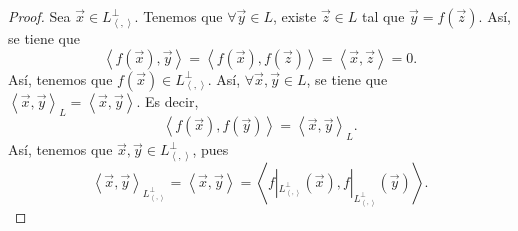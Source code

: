 \begin{proof}
Sea $\displaystyle \vec{x} \in L^{\perp }_{\left\langle ,  \right\rangle } $. Tenemos que $\displaystyle \forall\vec{y} \in L $, existe $\displaystyle \vec{z} \in L $ tal que $\displaystyle \vec{y} = f\left(\vec{z}\right) $. Así, se tiene que 
\[\left\langle f\left(\vec{x}\right), \vec{y} \right\rangle = \left\langle f\left(\vec{x}\right), f\left(\vec{z}\right) \right\rangle = \left\langle \vec{x}, \vec{z} \right\rangle = 0 .\]
Así, tenemos que $\displaystyle f\left(\vec{x}\right) \in L^{\perp }_{\left\langle ,  \right\rangle } $. Así, $\displaystyle \forall \vec{x}, \vec{y} \in L $, se tiene que $\displaystyle \left\langle \vec{x}, \vec{y} \right\rangle _{L} = \left\langle \vec{x}, \vec{y} \right\rangle  $. Es decir,
\[\left\langle f\left(\vec{x}\right), f\left(\vec{y}\right) \right\rangle = \left\langle \vec{x}, \vec{y} \right\rangle _{L} .\]
Así, tenemos que $\displaystyle \vec{x}, \vec{y} \in L^{\perp }_{\left\langle ,  \right\rangle } $, pues 
\[\left\langle \vec{x}, \vec{y} \right\rangle _{L^{\perp }_{\left\langle ,  \right\rangle }} = \left\langle \vec{x}, \vec{y} \right\rangle = \left\langle f|_{L^{\perp }_{\left\langle ,  \right\rangle }}\left(\vec{x}\right), f|_{L^{\perp }_{\left\langle ,  \right\rangle }}\left(\vec{y}\right) \right\rangle  .\]
\end{proof}

